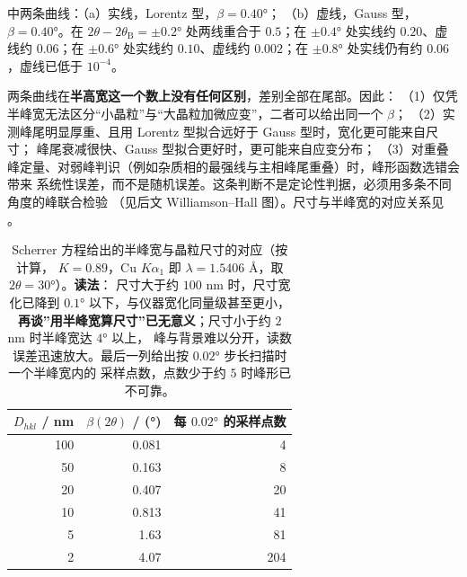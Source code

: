 \begin{example}
\begin{obs}
 中两条曲线：（a）实线，Lorentz 型，$\beta=0.40°$；
（b）虚线，Gauss 型，$\beta=0.40°$。在 $2\theta-2\theta_{\mathrm{B}}=\pm0.2°$ 处两线重合于
$0.5$；在 $\pm0.4°$ 处实线约 $0.20$、虚线约 $0.06$；在 $\pm0.6°$ 处实线约 $0.10$、虚线约
$0.002$；在 $\pm0.8°$ 处实线仍有约 $0.06$，虚线已低于 $10^{-4}$。
\end{obs}
\begin{infer}
两条曲线在\textbf{半高宽这一个数上没有任何区别}，差别全部在尾部。因此：
（1）仅凭半峰宽无法区分``小晶粒''与``大晶粒加微应变''，二者可以给出同一个 $\beta$；
（2）实测峰尾明显厚重、且用 Lorentz 型拟合远好于 Gauss 型时，宽化更可能来自尺寸；
峰尾衰减很快、Gauss 型拟合更好时，更可能来自应变分布；
（3）对重叠峰定量、对弱峰判识（例如杂质相的最强线与主相峰尾重叠）时，峰形函数选错会带来
系统性误差，而不是随机误差。这条判断不是定论性判据，必须用多条不同角度的峰联合检验
（见后文 Williamson--Hall 图）。尺寸与半峰宽的对应关系见
。
\end{infer}
\end{example}

\begin{table}[tbp]
  \centering
  \caption{Scherrer 方程给出的半峰宽与晶粒尺寸的对应（按 计算，
    $K=0.89$，Cu $K\alpha_{1}$ 即 $\lambda=1.5406$ Å，取 $2\theta=30°$）。\textbf{读法}：
    尺寸大于约 $100$ nm 时，尺寸宽化已降到 $0.1°$ 以下，与仪器宽化同量级甚至更小，
    \textbf{再谈''用半峰宽算尺寸''已无意义}；尺寸小于约 $2$ nm 时半峰宽达 $4°$ 以上，
    峰与背景难以分开，读数误差迅速放大。最后一列给出按 $0.02°$ 步长扫描时一个半峰宽内的
    采样点数，点数少于约 $5$ 时峰形已不可靠。}
  \label{tab:ch04c-scherrer}
  \begin{tabular}{@{}rrr@{}}
    \toprule
    $D_{hkl}$ / nm & $\beta(2\theta)$ / (°) & 每 $0.02°$ 的采样点数 \\
    \midrule
    100 & 0.081 & 4 \\
    50  & 0.163 & 8 \\
    20  & 0.407 & 20 \\
    10  & 0.813 & 41 \\
    5   & 1.63  & 81 \\
    2   & 4.07  & 204 \\
    \bottomrule
  \end{tabular}
\end{table}


